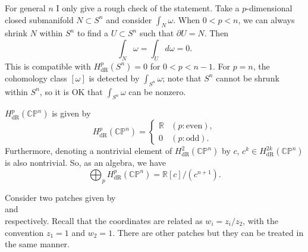 \documentclass[12pt]{article}
\numberwithin{equation}{section}
\numberwithin{figure}{section}
\theoremstyle{remark}
\def\bR{\mathbb{R}}
\def\CP{\mathbb{CP}}
\begin{document}
For general $n$ I only give a rough check of the statement.
Take a $p$-dimensional closed submanifold $N\subset S^n$
and consider  $\int_N \omega$.
When $0<p<n$,
we can always shrink $N$ within $S^n$ to find a $U\subset S^n$ such that $\partial U=N$.
Then \begin{equation}
\int_N \omega=\int_{U} d\omega=0.
\end{equation}
This is compatible with $H^p_\text{dR}(S^n)=0$ for $0<p<n-1$.
For $p=n$, the cohomology class $[\omega]$ is detected by $\int_{S^n} \omega$; 
note that $S^n$ cannot be shrunk within $S^n$, so it is OK that $\int_{S^n}\omega$ can be nonzero.


\begin{example}
$H^p_\text{dR}(\CP^n)$ is given by \[
H^p_\text{dR}(\CP^n)= \begin{cases}
\bR & (p: \text{even}), \\
0 & (p: \text{odd}) .
\end{cases}
\]
Furthermore, denoting a nontrivial element of $H^2_\text{dR}(\CP^n)$ by $c$,
$c^k \in H^{2k}_\text{dR}(\CP^n)$  is also nontrivial. 
So, as an algebra, we have \[
\bigoplus_p H^p_\text{dR}(\CP^n) = \bR[c]/(c^{n+1}).
\]
\end{example}

Consider two patches given by \begin{equation}
[1:z_2:z_3:\cdots:z_{n+1}]
\end{equation} and \begin{equation}
[w_1: 1: w_3:\cdots:w_{n+1}]
\end{equation} respectively. Recall that the coordinates are related as $w_i = z_i/z_2$, with the convention $z_1=1$ and $w_2=1$. 
There are other patches but they can be treated in the same manner.
\end{document}
